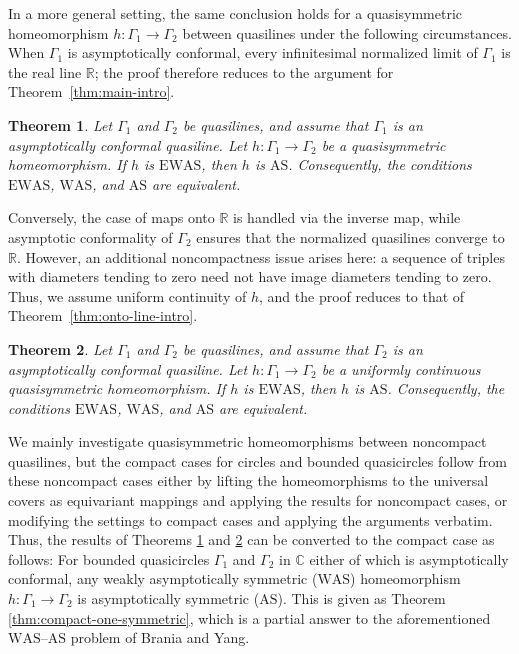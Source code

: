 \documentclass[10pt,a4paper]{amsart}
\numberwithin{equation}{section}
\newtheorem{theorem}{Theorem}[section]
\newcommand{\R}{\mathbb{R}}
\newcommand{\C}{\mathbb{C}}
\begin{document}
In a more general setting, the same conclusion holds for a quasisymmetric homeomorphism $h\colon\Gamma_1 \to \Gamma_2$ between quasilines under the following circumstances. 
When $\Gamma_1$ is asymptotically conformal, every infinitesimal normalized limit of $\Gamma_1$ is the real line $\R$; the proof therefore reduces to the argument for Theorem~\ref{thm:main-intro}.

\begin{theorem}\label{thm:symmetric-source-intro}
Let $\Gamma_1$ and $\Gamma_2$ be quasilines, and assume that $\Gamma_1$ is an asymptotically conformal quasiline.  
Let $h\colon\Gamma_1\to\Gamma_2$ be a quasisymmetric homeomorphism. 
If $h$ is $\mathrm{EWAS}$, then $h$ is $\mathrm{AS}$.
Consequently, the conditions $\mathrm{EWAS}$, $\mathrm{WAS}$, and $\mathrm{AS}$ are equivalent.
\end{theorem}

Conversely, the case of maps onto $\mathbb{R}$ is handled via the inverse map, while asymptotic conformality of $\Gamma_2$ ensures that the normalized quasilines converge to $\mathbb{R}$.
However, an additional noncompactness issue arises here: a sequence of triples with diameters tending to zero need not have image diameters tending to zero. 
Thus, we assume uniform continuity of $h$, and the proof reduces to that of Theorem~\ref{thm:onto-line-intro}. 

\begin{theorem}\label{thm:symmetric-target-intro}
Let $\Gamma_1$ and $\Gamma_2$ be quasilines, and assume that $\Gamma_2$ is an
asymptotically conformal quasiline.  
Let $h\colon\Gamma_1\to\Gamma_2$ be a uniformly continuous quasisymmetric homeomorphism.  
If $h$ is $\mathrm{EWAS}$, then $h$ is $\mathrm{AS}$.
Consequently, the conditions $\mathrm{EWAS}$, $\mathrm{WAS}$, and $\mathrm{AS}$ are equivalent.
\end{theorem}

We mainly investigate quasisymmetric homeomorphisms between noncompact quasilines, but the compact cases for circles and bounded quasicircles follow from these noncompact cases either by lifting the homeomorphisms to the universal covers as equivariant mappings and applying the results for noncompact cases, or modifying the settings to compact cases and applying the arguments verbatim.
Thus, the results of Theorems \ref{thm:symmetric-source-intro} and \ref{thm:symmetric-target-intro} can be converted to the compact case as follows:
For bounded quasicircles $\Gamma_1$ and $\Gamma_2$ in $\C$ either of which is asymptotically conformal, any weakly asymptotically symmetric ($\mathrm{WAS}$) homeomorphism
$h\colon\Gamma_1\longrightarrow\Gamma_2$ is asymptotically symmetric ($\mathrm{AS}$).
This is given as Theorem \ref{thm:compact-one-symmetric}, which
is a partial answer to the aforementioned $\mathrm{WAS}$--$\mathrm{AS}$ problem of Brania and Yang.
\end{document}
